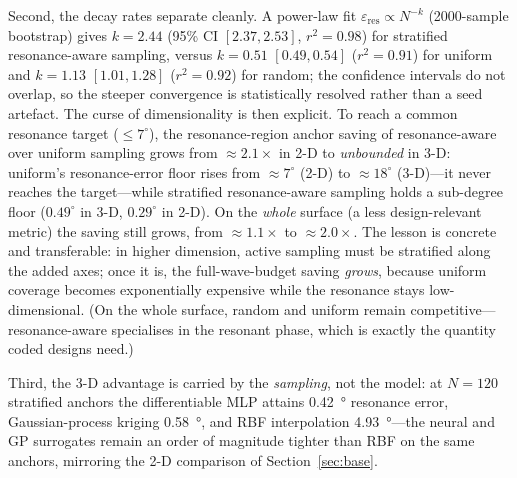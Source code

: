 \documentclass[11pt]{article}
\begin{document}
Second, the decay rates separate cleanly. A power-law fit $\varepsilon_\mathrm{res}\propto N^{-k}$
(2000-sample bootstrap) gives $k=2.44$ (95\% CI $[2.37,2.53]$, $r^2=0.98$) for stratified resonance-aware
sampling, versus $k=0.51$ $[0.49,0.54]$ ($r^2=0.91$) for uniform and $k=1.13$ $[1.01,1.28]$ ($r^2=0.92$) for random; the confidence
intervals do not overlap, so the steeper convergence is statistically resolved rather than a seed artefact.
The curse of dimensionality is then explicit. To reach a common resonance target ($\le\!7^\circ$), the
resonance-region anchor saving of resonance-aware over uniform sampling grows from $\approx\!2.1\times$ in
2-D to \emph{unbounded} in 3-D: uniform's resonance-error floor rises from $\approx\!7^\circ$ (2-D) to
$\approx\!18^\circ$ (3-D)---it never reaches the target---while stratified resonance-aware sampling holds a
sub-degree floor ($0.49^\circ$ in 3-D, $0.29^\circ$ in 2-D). On the \emph{whole} surface (a less
design-relevant metric) the saving still grows, from $\approx\!1.1\times$ to $\approx\!2.0\times$. The
lesson is concrete and transferable: in higher dimension, active sampling must be stratified along the
added axes; once it is, the full-wave-budget saving \emph{grows}, because uniform coverage becomes
exponentially expensive while the resonance stays low-dimensional. (On the whole surface, random and
uniform remain competitive---resonance-aware specialises in the resonant phase, which is exactly the
quantity coded designs need.)

Third, the 3-D advantage is carried by the \emph{sampling}, not the model: at $N\!=\!120$ stratified
anchors the differentiable MLP attains \SI{0.42}{\degree} resonance error, Gaussian-process kriging
\SI{0.58}{\degree}, and RBF interpolation \SI{4.93}{\degree}---the neural and GP surrogates remain an order
of magnitude tighter than RBF on the same anchors, mirroring the 2-D comparison of Section~\ref{sec:base}.
\end{document}
